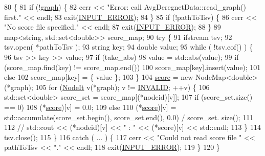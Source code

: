 \begin{DoxyCode}
80                                                               \{
81     \textcolor{keywordflow}{if} (!\hyperlink{classderegnet_1_1DeregnetData_ab76d30fa2ef87099faecb31e3f95b6d6}{graph}) \{
82         cerr << \textcolor{stringliteral}{"Error: call AvgDeregnetData::read\_graph() first."} << endl;
83         exit(\hyperlink{DeregnetData_8hpp_a288116f92845fddefeb044f5b84bc889}{INPUT\_ERROR});
84     \}
85     \textcolor{keywordflow}{if} (!pathToTsv) \{
86         cerr << \textcolor{stringliteral}{"No score file specified."} << endl;
87         exit(\hyperlink{DeregnetData_8hpp_a288116f92845fddefeb044f5b84bc889}{INPUT\_ERROR});
88     \}
89     map<string, std::set<double>> score\_map;
90     \textcolor{keywordflow}{try} \{
91         ifstream tsv;
92         tsv.open( *pathToTsv );
93         \textcolor{keywordtype}{string} key;
94         \textcolor{keywordtype}{double} value;
95         \textcolor{keywordflow}{while} ( !tsv.eof() ) \{
96               tsv >> key >> value;
97               \textcolor{keywordflow}{if} (take\_abs)
98                   value = std::abs(value);
99               \textcolor{keywordflow}{if} (score\_map.find(key) != score\_map.end())
100                   score\_map[key].insert(value);
101               \textcolor{keywordflow}{else}
102                   score\_map[key] = \{ value \};        
103         \}
104         \hyperlink{classderegnet_1_1DeregnetData_a32970c8f43eb8be313ad08d829223b1f}{score} = \textcolor{keyword}{new} NodeMap<double>(*graph);
105         \textcolor{keywordflow}{for} (\hyperlink{namespacederegnet_ac34314e1b5f456fc6d1bb9d96316de4a}{NodeIt} v(*graph); v != \hyperlink{usinglemon_8hpp_adf770fe2eec438e3758ffe905dbae208}{INVALID}; ++v) \{
106             std::set<double> score\_set = score\_map[(*nodeid)[v]];
107             \textcolor{keywordflow}{if} (score\_set.size() == 0)
108                 (*\hyperlink{classderegnet_1_1DeregnetData_a32970c8f43eb8be313ad08d829223b1f}{score})[v] = 0.0;
109             \textcolor{keywordflow}{else}
110                 (*\hyperlink{classderegnet_1_1DeregnetData_a32970c8f43eb8be313ad08d829223b1f}{score})[v] = std::accumulate(score\_set.begin(), score\_set.end(), 0.0) / score\_set.
      size();
111                 
112 \textcolor{comment}{//            std::cout << (*nodeid)[v] << " : " << (*score)[v] << std::endl;}
113         \}
114         tsv.close();
115     \}
116     \textcolor{keywordflow}{catch} ( ... ) \{
117       cerr << \textcolor{stringliteral}{"Could not read score file "} << pathToTsv << \textcolor{stringliteral}{"."} << endl;
118       exit(\hyperlink{DeregnetData_8hpp_a288116f92845fddefeb044f5b84bc889}{INPUT\_ERROR});
119     \}
120 \}
\end{DoxyCode}
